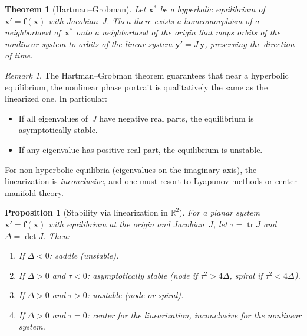 \documentclass[12pt,a4paper,openany]{book}
\theoremstyle{definition}
\theoremstyle{plain}
\newtheorem{theorem}[definition]{Theorem}
\newtheorem{proposition}[definition]{Proposition}
\theoremstyle{remark}
\newtheorem{remark}[definition]{Remark}
\newcommand{\R}{\mathbb{R}}
\DeclareMathOperator{\tr}{tr}
\begin{document}
\begin{theorem}[Hartman--Grobman]
\label{thm:hartman-grobman}
Let \(\mathbf{x}^*\) be a hyperbolic equilibrium of
\(\mathbf{x}'=\mathbf{f}(\mathbf{x})\) with Jacobian~\(J\). Then there exists
a homeomorphism of a neighborhood of~\(\mathbf{x}^*\) onto a neighborhood of
the origin that maps orbits of the nonlinear system to orbits of the linear
system \(\mathbf{y}'=J\,\mathbf{y}\), preserving the direction of time.
\end{theorem}

\begin{remark}
\label{rem:hartman-grobman}
The Hartman--Grobman theorem guarantees that near a hyperbolic equilibrium,
the nonlinear phase portrait is qualitatively the same as the linearized one.
In particular:
\begin{itemize}
  \item If all eigenvalues of~\(J\) have negative real parts, the equilibrium
    is asymptotically stable.
  \item If any eigenvalue has positive real part, the equilibrium is unstable.
\end{itemize}
For non-hyperbolic equilibria (eigenvalues on the imaginary axis), the
linearization is \emph{inconclusive}, and one must resort to Lyapunov methods
or center manifold theory.
\end{remark}

\begin{proposition}[Stability via linearization in \(\R^2\)]
\label{prop:linearization-2d}
For a planar system \(\mathbf{x}'=\mathbf{f}(\mathbf{x})\) with
equilibrium at the origin and Jacobian~\(J\), let
\(\tau=\tr J\) and \(\Delta=\det J\). Then:
\begin{enumerate}[label=(\roman*)]
  \item If \(\Delta<0\): saddle (unstable).
  \item If \(\Delta>0\) and \(\tau<0\): asymptotically stable (node if
    \(\tau^2>4\Delta\), spiral if \(\tau^2<4\Delta\)).
  \item If \(\Delta>0\) and \(\tau>0\): unstable (node or spiral).
  \item If \(\Delta>0\) and \(\tau=0\): center for the linearization,
    inconclusive for the nonlinear system.
\end{enumerate}
\end{proposition}

\end{document}
